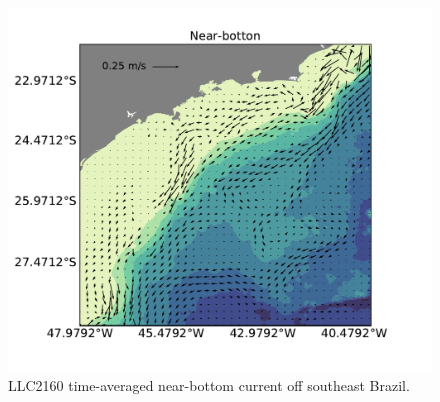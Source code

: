 \documentclass[11pt]{article}
\begin{document}
\begin{figure}[!ht]
  \centering
      \includegraphics[width=.8\textwidth]{figs/LLC2160_bottom-currents.pdf}
  \caption{LLC2160 time-averaged near-bottom current off southeast Brazil.}
          \label{LLC2160_bottom}
\end{figure}

\clearpage


\end{document}
